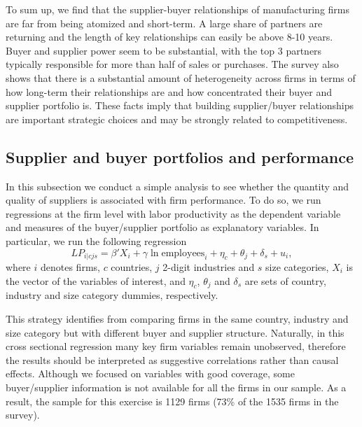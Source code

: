 \documentclass[final, dvipsnames, authoryear,12pt]{elsarticle}
\begin{document}
To sum up, we find that the supplier-buyer relationships of manufacturing firms are far from being atomized and short-term. A large share of partners are returning and the length of key relationships can easily be above 8-10 years. Buyer and supplier power seem to be substantial, with the top 3 partners typically responsible for more than half of sales or purchases. The survey also shows that there is a substantial amount of heterogeneity across firms in terms of how long-term their relationships are and how concentrated their buyer and supplier portfolio is. These facts imply that building supplier/buyer relationships are important strategic choices and may be strongly related to competitiveness.


\subsection{Supplier and buyer portfolios and performance}

In this subsection we conduct a simple analysis to see whether the quantity and quality of suppliers is associated with firm performance. To do so, we run regressions at the firm level with labor productivity as the dependent variable and measures of the buyer/supplier portfolio as explanatory variables. In particular, we run the following regression
%
\begin{equation}
    LP_{i|cjs}=\beta' X_{i}+\gamma \ln \text{employees}_i+\eta_c+\theta_j+\delta_s+u_i,
\end{equation}{}
%
where $i$ denotes firms, $c$ countries, $j$ 2-digit industries and $s$ size categories, $X_{i}$ is the vector of the variables of interest, and $\eta_c$, $\theta_j$ and $\delta_s$ are sets of country, industry and size category dummies, respectively. 



This strategy identifies from comparing firms in the same country, industry and size category but with different buyer and supplier structure. Naturally, in this cross sectional regression many key firm variables remain unobserved, therefore the results should be interpreted as suggestive correlations rather than causal effects. Although we focused on variables with good coverage, some buyer/supplier information is not available for all the firms in our sample. As a result, the sample for this exercise is 1129 firms (73\% of the 1535 firms in the survey). 
\end{document}

